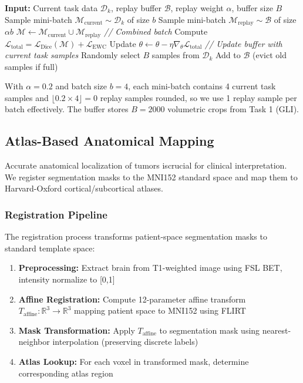 \documentclass[conference]{IEEEtran}
\begin{document}
\begin{algorithm}[h]
\caption{Experience Replay Training}
\begin{algorithmic}
\STATE \textbf{Input:} Current task data $\mathcal{D}_k$, replay buffer $\mathcal{B}$, replay weight $\alpha$, buffer size $B$
    \STATE Sample mini-batch $\mathcal{M}_{\text{current}} \sim \mathcal{D}_k$ of size $b$
    \STATE Sample mini-batch $\mathcal{M}_{\text{replay}} \sim \mathcal{B}$ of size $\alpha b$
    \STATE $\mathcal{M} \leftarrow \mathcal{M}_{\text{current}} \cup \mathcal{M}_{\text{replay}}$ \quad \textit{// Combined batch}
    \STATE Compute $\mathcal{L}_{\text{total}} = \mathcal{L}_{\text{Dice}}(\mathcal{M}) + \mathcal{L}_{\text{EWC}}$
    \STATE Update $\theta \leftarrow \theta - \eta \nabla_{\theta} \mathcal{L}_{\text{total}}$
\ENDWHILE
\STATE \textit{// Update buffer with current task samples}
\STATE Randomly select $B$ samples from $\mathcal{D}_k$
\STATE Add to $\mathcal{B}$ (evict old samples if full)
\end{algorithmic}
\end{algorithm}

With $\alpha=0.2$ and batch size $b=4$, each mini-batch contains 4 current task samples and $\lfloor 0.2 \times 4 \rfloor = 0$ replay samples rounded, so we use 1 replay sample per batch effectively. The buffer stores $B=2000$ volumetric crops from Task 1 (GLI).

\subsection{Atlas-Based Anatomical Mapping}

Accurate anatomical localization of tumors iscrucial for clinical interpretation. We register segmentation masks to the MNI152 standard space and map them to Harvard-Oxford cortical/subcortical atlases.

\subsubsection{Registration Pipeline}

The registration process transforms patient-space segmentation masks to standard template space:

\begin{enumerate}
\item \textbf{Preprocessing:} Extract brain from T1-weighted image using FSL BET, intensity normalize to [0,1]
\item \textbf{Affine Registration:} Compute 12-parameter affine transform $T_{\text{affine}}: \mathbb{R}^3 \to \mathbb{R}^3$ mapping patient space to MNI152 using FLIRT
\item \textbf{Mask Transformation:} Apply $T_{\text{affine}}$ to segmentation mask using nearest-neighbor interpolation (preserving discrete labels)
\item \textbf{Atlas Lookup:} For each voxel in transformed mask, determine corresponding atlas region
\end{enumerate}
\end{document}
